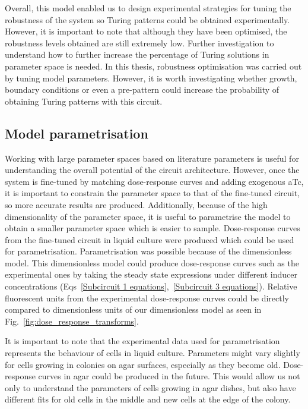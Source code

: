 Overall, this model enabled us to design experimental strategies for tuning the robustness of the system so Turing patterns could be obtained experimentally.
However, it is important to note that although they have been optimised, the robustness levels obtained are still extremely low.
Further investigation to understand how to further increase the percentage of Turing solutions in parameter space is needed.
In this thesis, robustness optimisation was carried out by tuning model parameters.
However, it is worth investigating whether growth, boundary conditions or even a pre-pattern could increase the probability of obtaining Turing patterns with this circuit.

\subsection{Model parametrisation}
Working with large parameter spaces based on literature parameters is useful for understanding the overall potential of the circuit architecture.
However, once the system is fine-tuned by matching dose-response curves and adding exogenous aTc, it is important to constrain the parameter space to that of the fine-tuned circuit, so more accurate results are produced.
Additionally, because of the high dimensionality of the parameter space, it is useful to parametrise the model to obtain a smaller parameter space which is easier to sample.
Dose-response curves from the fine-tuned circuit in liquid culture were produced which could be used for parametrisation.
Parametrisation was possible because of the dimensionless model.
This dimensionless model could produce dose-response curves such as the experimental ones by taking the steady state expressions under different inducer concentrations (Eqs~\ref{Subcircuit 1 equations},~\ref{Subcircuit 3 equations}).
Relative fluorescent units from the experimental dose-response curves could be directly compared to dimensionless units of our dimensionless model as seen in Fig.~\ref{fig:dose_response_transforms}.

It is important to note that the experimental data used for parametrisation represents the behaviour of cells in liquid culture.
Parameters might vary slightly for cells growing in colonies on agar surfaces, especially as they become old.
Dose-response curves in agar could be produced in the future.
This would allow us not only to understand the parameters of cells growing in agar dishes, but also have different fits for old cells in the middle and new cells at the edge of the colony.

